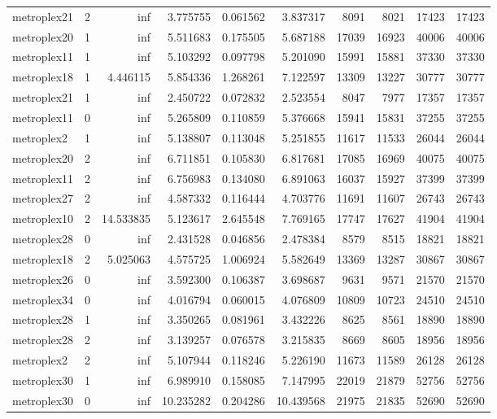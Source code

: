 \begin{longtable}{|l|r|r|r|r|r|r|r|r|r|}
metroplex21 & 2 & inf & 3.775755 & 0.061562 & 3.837317 & 8091 & 8021 & 17423 & 17423 \\
metroplex20 & 1 & inf & 5.511683 & 0.175505 & 5.687188 & 17039 & 16923 & 40006 & 40006 \\
metroplex11 & 1 & inf & 5.103292 & 0.097798 & 5.201090 & 15991 & 15881 & 37330 & 37330 \\
metroplex18 & 1 & 4.446115 & 5.854336 & 1.268261 & 7.122597 & 13309 & 13227 & 30777 & 30777 \\
metroplex21 & 1 & inf & 2.450722 & 0.072832 & 2.523554 & 8047 & 7977 & 17357 & 17357 \\
metroplex11 & 0 & inf & 5.265809 & 0.110859 & 5.376668 & 15941 & 15831 & 37255 & 37255 \\
metroplex2 & 1 & inf & 5.138807 & 0.113048 & 5.251855 & 11617 & 11533 & 26044 & 26044 \\
metroplex20 & 2 & inf & 6.711851 & 0.105830 & 6.817681 & 17085 & 16969 & 40075 & 40075 \\
metroplex11 & 2 & inf & 6.756983 & 0.134080 & 6.891063 & 16037 & 15927 & 37399 & 37399 \\
metroplex27 & 2 & inf & 4.587332 & 0.116444 & 4.703776 & 11691 & 11607 & 26743 & 26743 \\
metroplex10 & 2 & 14.533835 & 5.123617 & 2.645548 & 7.769165 & 17747 & 17627 & 41904 & 41904 \\
metroplex28 & 0 & inf & 2.431528 & 0.046856 & 2.478384 & 8579 & 8515 & 18821 & 18821 \\
metroplex18 & 2 & 5.025063 & 4.575725 & 1.006924 & 5.582649 & 13369 & 13287 & 30867 & 30867 \\
metroplex26 & 0 & inf & 3.592300 & 0.106387 & 3.698687 & 9631 & 9571 & 21570 & 21570 \\
metroplex34 & 0 & inf & 4.016794 & 0.060015 & 4.076809 & 10809 & 10723 & 24510 & 24510 \\
metroplex28 & 1 & inf & 3.350265 & 0.081961 & 3.432226 & 8625 & 8561 & 18890 & 18890 \\
metroplex28 & 2 & inf & 3.139257 & 0.076578 & 3.215835 & 8669 & 8605 & 18956 & 18956 \\
metroplex2 & 2 & inf & 5.107944 & 0.118246 & 5.226190 & 11673 & 11589 & 26128 & 26128 \\
metroplex30 & 1 & inf & 6.989910 & 0.158085 & 7.147995 & 22019 & 21879 & 52756 & 52756 \\
metroplex30 & 0 & inf & 10.235282 & 0.204286 & 10.439568 & 21975 & 21835 & 52690 & 52690 \\

\end{longtable}
